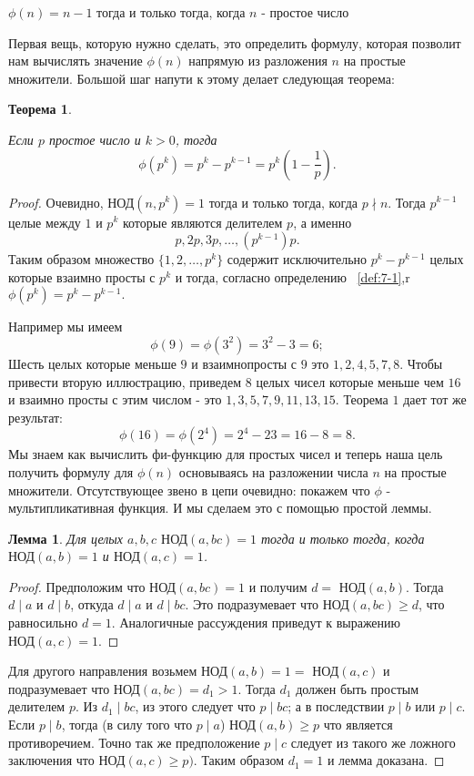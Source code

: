 \documentclass[11pt]{article}
\newtheorem{theorem}{Теорема}
\newtheorem{lemma}{Лемма}
\begin{document}
\begin{center}
	$\phi (n)=n-1$ тогда и только тогда, когда $n$ - простое число
\end{center}
Первая вещь, которую нужно сделать, это определить формулу, которая позволит нам вычислять значение $\phi (n)$ напрямую из разложения $n$ на простые множители. Большой шаг напути к этому делает следующая теорема: 
\begin{theorem}
\label{th:7-1}
	
	Если $ p $ простое число и $ k>0 $, тогда 
	\[\phi (p^{k})=	p^{k}-p^{k-1}=p^{k}(1-\dfrac{1}{p}).\]
\end{theorem} 
\begin{proof}
	Очевидно,  $\text{НОД}(n,p^k)=1$ тогда и только тогда, когда $p\nmid n$. Тогда $p^{k-1}$ целые между $1$ и $p^{k}$ которые являются делителем $p$, а именно  
	\[p,2p,3p, \ldots, (p^{k-1})p.\] Таким образом множество $\{1,2,\ldots,p^k\}$ содержит исключительно $p^{k}-p^{k-1}$ целых которые взаимно просты с $p^k$ и тогда, согласно определению ~\ref{def:7-1},r $\phi (p^k)=p^{k}-p^{k-1}.$	
	
	Например мы имеем 
	\[
	\phi (9)=\phi (3^2)=3^{2}-3=6;
	\]
	Шесть целых которые меньше $9$ и взаимнопросты с $9$ это $1, 2, 4, 5, 7, 8$.
	Чтобы привести вторую иллюстрацию, приведем $8$ целых чисел которые меньше чем $16$ и взаимно просты с этим числом - это $1,3,5,7,9,11,13,15$. Теорема $1$ дает тот же результат:
	\[
	\phi (16)= \phi (2^4)=2^{4}-2{3}=16-8=8.
	\]
	Мы знаем как вычислить фи-функцию для простых чисел и теперь наша цель получить формулу для $\phi (n)$ основываясь на разложении числа $n$ на простые множители. Отсутствующее звено в цепи очевидно: покажем что $\phi $ - мультипликативная функция. И мы сделаем это с помощью простой леммы.
	
\begin{lemma}
Для целых $a, b, c$  $\text{НОД}(a,bc) = 1$ тогда и только тогда, когда  $\text{НОД}(a,b)=1$ и  $\text{НОД}(a,c)=1$.
\end{lemma}
\begin{proof}
	Предположим что  $\text{НОД}(a,bc)=1$ и получим $d=$ $\text{НОД}(a,b)$. Тогда $d\mid a$ и $d\mid b$, откуда $d \mid a$ и $d\mid bc$. Это подразумевает что $\text{НОД}(a,bc) \geq d$, что равносильно $d=1$. Аналогичные рассуждения приведут к выражению  $\text{НОД}(a,c)=1$. 
\end{proof}
	Для другого направления возьмем  $\text{НОД}(a,b)=1=$ $\text{НОД}(a,c)$ и подразумевает что  $\text{НОД}(a,bc)=d_{1}>1.$ Тогда $d_1$ должен быть простым делителем $p$. Из $d_{1} \mid bc$, из этого следует что $p \mid bc$; а в последствии $p \mid b$ или $p \mid c$. Если $p \mid b$, тогда (в силу того что $p \mid a$)  $\text{НОД}(a,b) \geq p $ что является противоречием. Точно так же предположение $p \mid c$ следует из такого же ложного заключения что  $\text{НОД}(a,c) \geq p)$. Таким образом $d_1 = 1$ и лемма доказана.
\end{proof}
\end{document}
